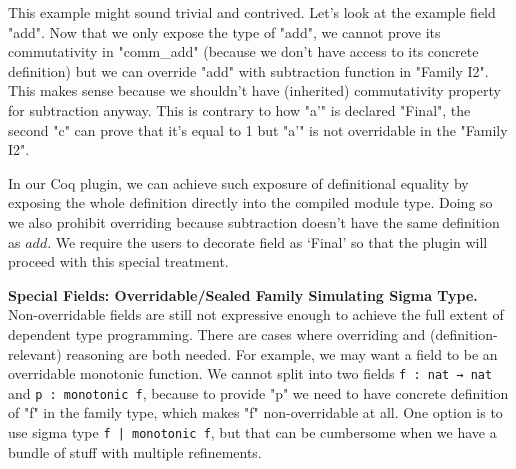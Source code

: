 This example might sound trivial and contrived. Let's look at the
example field "add". Now that we only expose the type of "add", we
cannot prove its commutativity in "comm_add" (because we don't have
access to its concrete definition) but we can override "add" with
subtraction function in "Family I2". This makes sense because we
shouldn't have (inherited) commutativity property for subtraction
anyway. This is contrary to how "a'" is declared "Final", the second "c"
can prove that it's equal to 1 but "a'" is not overridable in the
"Family I2".


In our Coq plugin, we can achieve such exposure of definitional equality by
exposing the whole definition directly into the compiled module type. Doing so we also prohibit overriding because
subtraction doesn't have the same definition as $add$. We require the
users to decorate field as `Final' so that the plugin will proceed with
this special treatment.

\textbf{Special Fields: Overridable/Sealed Family Simulating Sigma Type.} 
Non-overridable fields are still not expressive enough to achieve the full
extent of dependent type programming. There are cases where overriding and
(definition-relevant) reasoning are both needed. For example, we may want a field to be an overridable monotonic function. We cannot split into two fields
\texttt{f : nat → nat} and \texttt{p : monotonic f},
because to provide
"p" we need to have concrete definition of "f" in the family type, which
makes "f" non-overridable at all. One option is to use sigma type
\texttt{{f | monotonic f}}, but that can be cumbersome when we have
a bundle of stuff with multiple refinements. 

